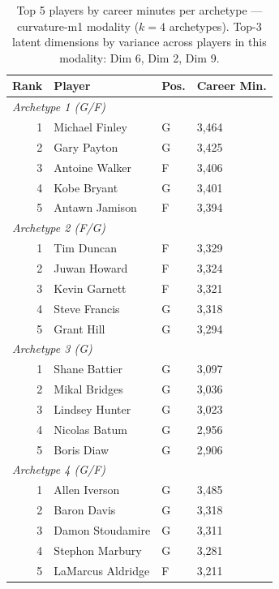 \begin{table}[htbp]
  \centering\small
  \begin{tabular}{rlll}
    \toprule
    Rank & Player & Pos. & Career Min. \\
    \midrule
    \multicolumn{4}{l}{\textit{Archetype 1 (G/F)}} \\
    \midrule
    1 & Michael Finley & G & 3,464 \\
    2 & Gary Payton & G & 3,425 \\
    3 & Antoine Walker & F & 3,406 \\
    4 & Kobe Bryant & G & 3,401 \\
    5 & Antawn Jamison & F & 3,394 \\
    \midrule[0.4pt]
    \multicolumn{4}{l}{\textit{Archetype 2 (F/G)}} \\
    \midrule
    1 & Tim Duncan & F & 3,329 \\
    2 & Juwan Howard & F & 3,324 \\
    3 & Kevin Garnett & F & 3,321 \\
    4 & Steve Francis & G & 3,318 \\
    5 & Grant Hill & G & 3,294 \\
    \midrule[0.4pt]
    \multicolumn{4}{l}{\textit{Archetype 3 (G)}} \\
    \midrule
    1 & Shane Battier & G & 3,097 \\
    2 & Mikal Bridges & G & 3,036 \\
    3 & Lindsey Hunter & G & 3,023 \\
    4 & Nicolas Batum & G & 2,956 \\
    5 & Boris Diaw & G & 2,906 \\
    \midrule[0.4pt]
    \multicolumn{4}{l}{\textit{Archetype 4 (G/F)}} \\
    \midrule
    1 & Allen Iverson & G & 3,485 \\
    2 & Baron Davis & G & 3,318 \\
    3 & Damon Stoudamire & G & 3,311 \\
    4 & Stephon Marbury & G & 3,281 \\
    5 & LaMarcus Aldridge & F & 3,211 \\
    \bottomrule
  \end{tabular}
  \caption{Top 5 players by career minutes per archetype --- curvature-m1 modality ($k=4$ archetypes). Top-3 latent dimensions by variance across players in this modality: Dim 6, Dim 2, Dim 9.}
  \label{tab:arch_reps_curvature_m1}
\end{table}

